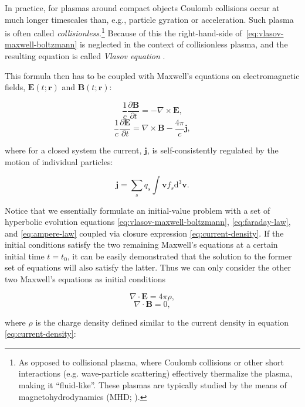 In practice, for plasmas around compact objects Coulomb collisions occur at much longer timescales than, e.g., particle gyration or acceleration. Such plasma is often called \emph{collisionless}.\footnote{As opposed to collisional plasma, where Coulomb collisions or other short interactions (e.g. wave-particle scattering) effectively thermalize the plasma, making it ``fluid-like''. These plasmas are typically studied by the means of magnetohydrodynamics (MHD; \citealt{1960ecm..book.....L}).} Because of this the right-hand-side of~\eqref{eq:vlasov-maxwell-boltzmann} is neglected in the context of collisionless plasma, and the resulting equation is called \emph{Vlasov equation} \citep{1968SvPhU..10..721V}. 


This formula then has to be coupled with Maxwell's equations on electromagnetic fields, $\bm{E}(t;\bm{r})$ and $\bm{B}(t;\bm{r})$:

\begin{multicols}{2}
  \begin{equation}
    \label{eq:faraday-law}
    \frac{1}{c}\frac{\partial \bm{B}}{\partial t} = -\nabla \times\bm{E},
  \end{equation}
  \begin{equation}
    \label{eq:ampere-law}
    \frac{1}{c}\frac{\partial \bm{E}}{\partial t} = \nabla \times\bm{B} - \frac{4\pi}{c}\bm{j},
  \end{equation}
\end{multicols}
\noindent where for a closed system the current, $\bm{j}$, is self-consistently regulated by the motion of individual particles:

\begin{equation}
  \label{eq:current-density}
  \bm{j} = \sum_s q_s \int \bm{v} f_s \mathrm{d}^3\bm{v}.
\end{equation}

Notice that we essentially formulate an initial-value problem with a set of hyperbolic evolution equations \eqref{eq:vlasov-maxwell-boltzmann}, \eqref{eq:faraday-law}, and \eqref{eq:ampere-law} coupled via closure expression \eqref{eq:current-density}. If the initial conditions satisfy the two remaining Maxwell's equations at a certain initial time $t=t_0$, it can be easily demonstrated that the solution to the former set of equations will also satisfy the latter. Thus we can only consider the other two Maxwell's equations as initial conditions

\begin{multicols}{2}
  \begin{equation}
    \label{eq:poisson-law}
    \nabla\cdot \bm{E} = 4\pi \rho,
  \end{equation}
  \begin{equation}
    \label{eq:divb-law}
    \nabla\cdot \bm{B} = 0,
  \end{equation}
\end{multicols}
\noindent where $\rho$ is the charge density defined similar to the current density in equation \eqref{eq:current-density}:

